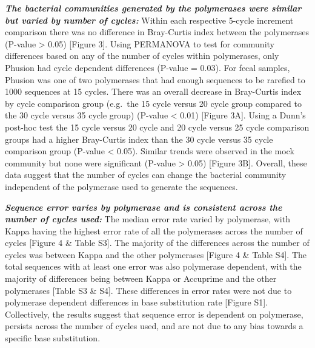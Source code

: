 \documentclass[11pt,]{article}
\begin{document}
\textbf{\emph{The bacterial communities generated by the polymerases
were similar but varied by number of cycles:}} Within each respective
5-cycle increment comparison there was no difference in Bray-Curtis
index between the polymerases (P-value \textgreater{} 0.05) {[}Figure
3{]}. Using PERMANOVA to test for community differences based on any of
the number of cycles within polymerases, only Phusion had cycle
dependent differences (P-value = 0.03). For fecal samples, Phusion was
one of two polymerases that had enough sequences to be rarefied to 1000
sequences at 15 cycles. There was an overall decrease in Bray-Curtis
index by cycle comparison group (e.g.~the 15 cycle versus 20 cycle group
compared to the 30 cycle versus 35 cycle group) (P-value \textless{}
0.01) {[}Figure 3A{]}. Using a Dunn's post-hoc test the 15 cycle versus
20 cycle and 20 cycle versus 25 cycle comparison groups had a higher
Bray-Curtis index than the 30 cycle versus 35 cycle comparison group
(P-value \textless{} 0.05). Similar trends were observed in the mock
community but none were significant (P-value \textgreater{} 0.05)
{[}Figure 3B{]}. Overall, these data suggest that the number of cycles
can change the bacterial community independent of the polymerase used to
generate the sequences.

\textbf{\emph{Sequence error varies by polymerase and is consistent
across the number of cycles used:}} The median error rate varied by
polymerase, with Kappa having the highest error rate of all the
polymerases across the number of cycles {[}Figure 4 \& Table S3{]}. The
majority of the differences across the number of cycles was between
Kappa and the other polymerases {[}Figure 4 \& Table S4{]}. The total
sequences with at least one error was also polymerase dependent, with
the majority of differences being between Kappa or Accuprime and the
other polymerases {[}Table S3 \& S4{]}. These differences in error rates
were not due to polymerase dependent differences in base substitution
rate {[}Figure S1{]}. Collectively, the results suggest that sequence
error is dependent on polymerase, persists across the number of cycles
used, and are not due to any bias towards a specific base substitution.
\end{document}
